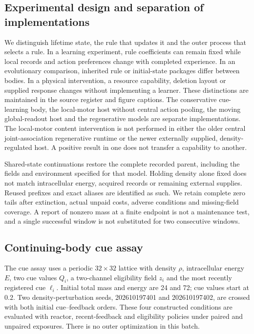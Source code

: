 

\subsection*{Experimental design and separation of implementations}

We distinguish lifetime state, the rule that updates it and the outer process that selects a rule. In a learning experiment, rule coefficients can remain fixed while local records and action preferences change with completed experience. In an evolutionary comparison, inherited rule or initial-state packages differ between bodies. In a physical intervention, a resource capability, deletion layout or supplied response changes without implementing a learner. These distinctions are maintained in the source register and figure captions. The conservative cue-learning body, the local-motor host without central action pooling, the moving global-readout host and the regenerative models are separate implementations. The local-motor content intervention is not performed in either the older central joint-association regenerative runtime or the newer externally supplied, density-regulated host. A positive result in one does not transfer a capability to another.

Shared-state continuations restore the complete recorded parent, including the fields and environment specified for that model. Holding density alone fixed does not match intracellular energy, acquired records or remaining external supplies. Reused prefixes and exact aliases are identified as such. We retain complete zero tails after extinction, actual unpaid costs, adverse conditions and missing-field coverage. A report of nonzero mass at a finite endpoint is not a maintenance test, and a single successful window is not substituted for two consecutive windows.

\subsection*{Continuing-body cue assay}

The cue assay uses a periodic $32\times32$ lattice with density $\rho$, intracellular energy $E$, two cue values $Q_i$, a two-channel eligibility field $z_i$ and the most recently registered cue $\ell_i$. Initial total mass and energy are 24 and 72; cue values start at $0.2$. Two density-perturbation seeds, 202610197401 and 202610197402, are crossed with both initial cue--feedback orders. These four constructed conditions are evaluated with reactor, recent-feedback and eligibility policies under paired and unpaired exposures. There is no outer optimization in this batch.

